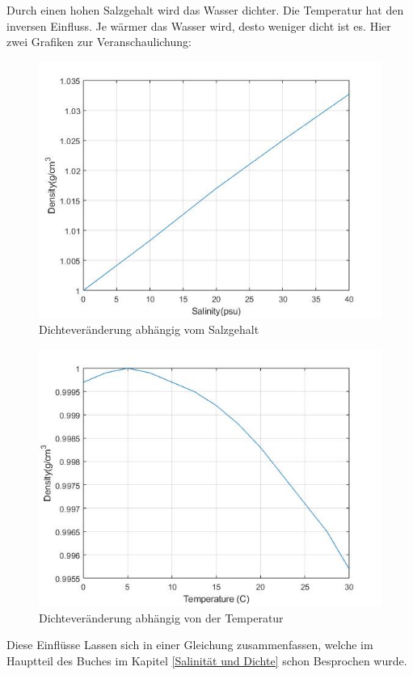 Durch einen hohen Salzgehalt wird das Wasser dichter. Die Temperatur hat den inversen Einfluss. Je wärmer das Wasser wird, desto weniger dicht ist es. 
Hier zwei Grafiken zur Veranschaulichung:
\begin{figure}
\includegraphics{code/graphs/graph_salinity.jpg}
\caption{Dichteveränderung abhängig vom Salzgehalt}
\end{figure}

\begin{figure}
\includegraphics{code/graphs/graph_temp.jpg}
\caption{Dichteveränderung abhängig von der Temperatur}
\end{figure}

Diese Einflüsse Lassen sich in einer Gleichung zusammenfassen, welche im Hauptteil des Buches im Kapitel \ref{Salinität und Dichte} schon Besprochen wurde.

